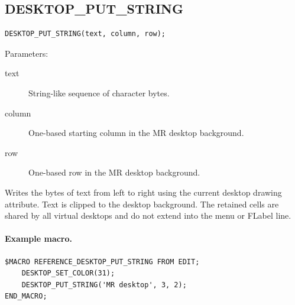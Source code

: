 \documentclass[a4paper,10pt,twoside,openany]{book}
\newenvironment{mrmacextension}{\begin{changebar}}{\end{changebar}}
\begin{document}
\begin{mrmacextension}
\label{prim:procedure-desktop-put-string}
\subsection*{DESKTOP\_PUT\_STRING}
\begin{verbatim}
DESKTOP_PUT_STRING(text, column, row);
\end{verbatim}
Parameters:
\begin{description}
\item[text] String-like sequence of character bytes.
\item[column] One-based starting column in the MR desktop background.
\item[row] One-based row in the MR desktop background.
\end{description}

Writes the bytes of text from left to right using the current desktop drawing
attribute. Text is clipped to the desktop background. The retained cells are
shared by all virtual desktops and do not extend into the menu or FLabel line.

\paragraph{Example macro.}
\begin{verbatim}
$MACRO REFERENCE_DESKTOP_PUT_STRING FROM EDIT;
    DESKTOP_SET_COLOR(31);
    DESKTOP_PUT_STRING('MR desktop', 3, 2);
END_MACRO;
\end{verbatim}
\end{mrmacextension}
\end{document}
